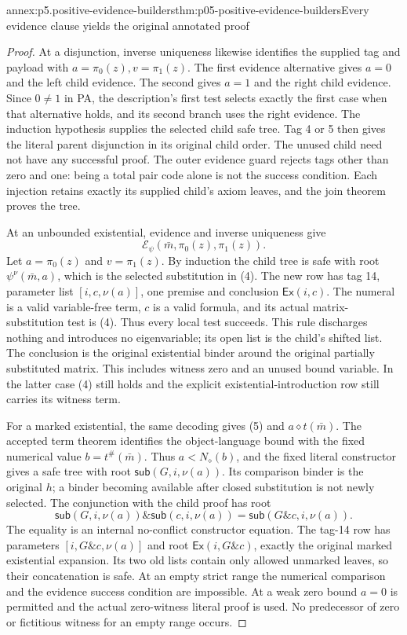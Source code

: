 \begin{annexitem}{annex:p5.positive-evidence-builders}{thm:p05-positive-evidence-builders}{Every evidence clause yields the original annotated proof}
\begin{proof}
At a disjunction, inverse uniqueness likewise identifies the supplied
tag and payload with \(a=\pi_0(z),v=\pi_1(z)\). The first evidence
alternative gives \(a=0\) and the left child evidence. The second
gives \(a=1\) and the right child evidence. Since \(0\ne1\) in
PA, the description's first test selects exactly the first case when
that alternative holds, and its second branch uses the right evidence.
The induction hypothesis supplies the selected child safe tree. Tag 4
or 5 then gives the literal parent disjunction in its original child
order. The unused child need not have any successful proof. The outer
evidence guard rejects tags other than zero and one: being a total pair
code alone is not the success condition. Each injection retains exactly
its supplied child's axiom leaves, and the join theorem proves the tree.

At an unbounded existential, evidence and inverse uniqueness give
\[
            \mathcal E_\psi(\bar m,\pi_0(z),\pi_1(z)).
\tag{5}
\]
Let \(a=\pi_0(z)\) and \(v=\pi_1(z)\). By induction the child
tree is safe with root \(\psi^\nu(\bar m,a)\), which is the
selected substitution in (4). The new row has tag 14, parameter list
\([i,c,\nu(a)]\), one premise and conclusion \(\mathsf{Ex}(i,c)\).
The numeral is a valid variable-free term, \(c\) is a valid formula,
and its actual matrix-substitution test is (4). Thus every local
test succeeds. This rule discharges nothing and introduces no
eigenvariable; its open list is the child's shifted list. The
conclusion is the original existential binder around the original
partially substituted matrix. This includes witness zero and an
unused bound variable. In the latter case (4) still holds and the
explicit existential-introduction row still carries its witness term.

For a marked existential, the same decoding gives (5) and
\(a\mathrel\diamond t(\bar m)\). The accepted term theorem
identifies the object-language bound with the fixed numerical value
\(b=t^\#(\bar m)\). Thus \(a<N_\diamond(b)\), and the fixed
literal constructor gives a safe tree with root
\(\mathsf{sub}(G,i,\nu(a))\). Its comparison binder is the
original \(h\); a binder becoming available after closed substitution
is not newly selected. The conjunction with the child proof has root
\[
 \mathsf{sub}(G,i,\nu(a))\mathbin{\&}\mathsf{sub}(c,i,\nu(a))
                  =\mathsf{sub}(G\mathbin{\&}c,i,\nu(a)).
\tag{6}
\]
The equality is an internal no-conflict constructor equation. The
tag-14 row has parameters \([i,G\mathbin{\&}c,\nu(a)]\) and
root \(\mathsf{Ex}(i,G\mathbin{\&}c)\), exactly the original
marked existential expansion. Its two old lists contain only allowed
unmarked leaves, so their concatenation is safe. At an empty strict
range the numerical comparison and the evidence success condition
are impossible. At a weak zero bound \(a=0\) is permitted and
the actual zero-witness literal proof is used. No predecessor of
zero or fictitious witness for an empty range occurs.


\end{proof}
\end{annexitem}
